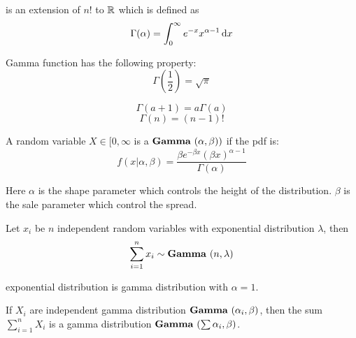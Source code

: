 \begin{definition}
     is an extension of $n!$ to $\mathbb{R}$ which is defined as
    \begin{equation}
        \Gamma(\alpha) = \int_0^\infty e^{-x} x^{\alpha - 1} \dif{x}
    \end{equation}

    Gamma function has the following property:
    \begin{equation}
        \Gamma \left(\frac{1}{2} \right) = \sqrt{\pi}
    \end{equation}
    
    \begin{equation}
        \Gamma (a + 1) = a \Gamma(a)
    \end{equation}
    \begin{equation}
        \Gamma (n) = (n-1)!
    \end{equation}
\end{definition}


\begin{definition}
    A random variable $X \in [0,\infty$ is a  $\mathop{\bf Gamma\/}~(\alpha,\beta))$ if the pdf is:
    \begin{equation}
        f(x|\alpha, \beta) = \frac{\beta e^{-\beta x} (\beta x)^{\alpha - 1}}{\Gamma(\alpha)}
    \end{equation}   
    
    Here $\alpha$ is the shape parameter which controls the height of the distribution. $\beta$ is the sale parameter which control the spread.
\end{definition}

\begin{example}
    Let $x_i$ be $n$ independent random variables with exponential distribution $\lambda$, then
    \begin{equation}
        \sum_{i=1}^n x_i \sim \mathop{\bf Gamma\/}~(n,\lambda)
    \end{equation}
    
    exponential distribution is gamma distribution with $\alpha = 1$.
\end{example}

\begin{theorem}
    If $X_i$ are independent gamma distribution $\mathop{\bf Gamma\/}~(\alpha_i,\beta)$, then the sum $\displaystyle \sum_{i=1}^n X_i$ is a gamma distribution $\mathop{\bf Gamma\/}~(\sum \alpha_i,\beta)$.
\end{theorem}


